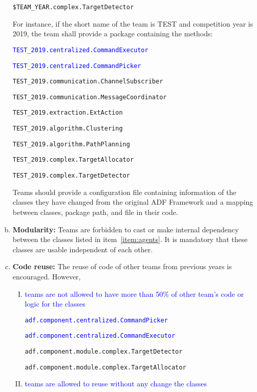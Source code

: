 \documentclass{article}
\begin{document}
\begin{enumerate}[(a)]
\texttt{\$TEAM\_YEAR.complex.TargetDetector}

\normalsize
For instance, if the short name of the team is TEST and competition year is 2019, the team shall provide a package containing the methods:

\small

\texttt{\textcolor{blue}{TEST\_2019.centralized.CommandExecutor}}

\texttt{\textcolor{blue}{TEST\_2019.centralized.CommandPicker}}

\texttt{TEST\_2019.communication.ChannelSubscriber}

\texttt{TEST\_2019.communication.MessageCoordinator}

\texttt{TEST\_2019.extraction.ExtAction}

\texttt{TEST\_2019.algorithm.Clustering}

\texttt{TEST\_2019.algorithm.PathPlanning}

\texttt{TEST\_2019.complex.TargetAllocator}

\texttt{TEST\_2019.complex.TargetDetector}

\normalsize


Teams should provide a configuration file containing information of the classes they have changed from the original ADF Framework and a mapping between classes, package path, and file in their code. \label{item:agents}
\item \textbf{Modularity:} Teams are forbidden to cast or make internal dependency between the classes listed in item~\ref{item:agents}. It is mandatory that these classes are usable independent of each other.
\item \textbf{Code reuse:} The reuse of code of other teams from previous years is encouraged. However,

\begin{enumerate}[I.]
  \item \textcolor{blue}{teams are not allowed to have more than 50\% of other team's code or logic for the classes}

  \small

  \texttt{\textcolor{blue}{adf.component.centralized.CommandPicker}}

  \texttt{\textcolor{blue}{adf.component.centralized.CommandExecutor}}

  \texttt{adf.component.module.complex.TargetDetector}

  \texttt{adf.component.module.complex.TargetAllocator}
  \item \textcolor{blue}{teams are allowed to reuse without any change the classes}


\end{enumerate}
\end{enumerate}
\end{document}
